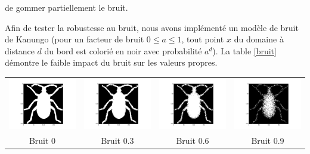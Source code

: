 \documentclass[a4paper,10pt]{article} %
\theoremstyle{definition} %
\begin{document}
 de gommer partiellement le bruit.

Afin de tester la robustesse au bruit, nous avons implémenté un modèle de bruit de Kanungo (pour un facteur de bruit $0 \leq a \leq 1$, tout point $x$ du domaine à distance $d$ du bord est colorié en noir avec probabilité $a^d$). La table \ref{bruit} démontre le faible impact du bruit sur les valeurs propres.

\begin{center}
  \begin{tabular}{c c c c}
    \includegraphics[scale=0.15]{noise/0.png} & \includegraphics[scale=0.15]{noise/0_3.png} & \includegraphics[scale=0.15]{noise/0_6.png} & \includegraphics[scale=0.15]{noise/0_9.png} \\
    Bruit 0 & Bruit 0.3 & Bruit 0.6 & Bruit 0.9
  \end{tabular}
\end{center}

\begin{table}[H]
  \begin{center}
\end{center}
\end{table}
\end{document}
